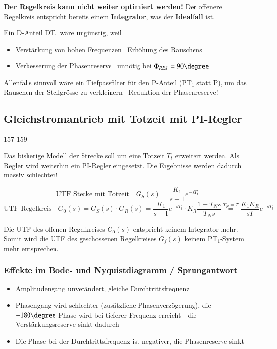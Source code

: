 \textbf{Der Regelkreis kann nicht weiter optimiert werden!} Der offenere Regelkreis entspricht bereits einem \textbf{Integrator},
was der \textbf{Idealfall} ist. 

Ein D-Anteil $\text{DT}_1$ wäre ungünstig, weil

\begin{itemize}
    \item Verstärkung von hohen Frequenzen \textrightarrow\ Erhöhung des Rauschens
    \item Verbesserung der Phasenreserve \textrightarrow\ unnötig bei $\Phi_{RES} = 90 \degree$
\end{itemize}

Allenfalls sinnvoll wäre ein Tiefpassfilter für den P-Anteil ($\text{PT}_1$ statt P), um das Rauschen der Stellgrösse zu 
verkleinern \textrightarrow\ Reduktion der Phasenreserve!


\subsection{Gleichstromantrieb mit Totzeit mit PI-Regler}{157-159}

Das bisherige Modell der Strecke soll um eine Totzeit $T_t$ erweitert werden. Als Regler wird weiterhin ein PI-Regler eingesetzt.
Die Ergebnisse werden dadurch massiv schlechter!

$$ \text{UTF Stecke mit Totzeit} \quad G_S(s) = \frac{K_1}{s + 1} e^{-s T_t} $$
$$ \text{UTF Regelkreis} \quad G_0(s) = G_S(s) \cdot G_R(s) = \frac{K_1}{s + 1} e^{-s T_t} \cdot K_R \frac{1 + T_N s}{T_N s}
    \overset{T_N = T}{=} \frac{K_1 K_R}{s T} e^{-s T_t} $$

Die UTF des offenen Regelkreises $G_0(s)$ entspricht keinem Integrator mehr. Somit wird die UTF des geschossenen Regelkreises 
$G_f(s)$ keinem $\text{PT}_1$-System mehr entsprechen. 


\subsubsection{Effekte im Bode- und Nyquistdiagramm / Sprungantwort}

\begin{itemize}
    \item Amplitudengang unverändert, gleiche Durchtrittsfrequenz
    \item Phasengang wird schlechter (zusätzliche Phasenverzögerung), die $-180 \degree$ Phase wird bei tieferer
        Frequenz erreicht - die Verstärkungsreserve sinkt dadurch
    \item Die Phase bei der Durchtrittsfrequenz ist negativer, die Phasenreserve sinkt
\end{itemize}

